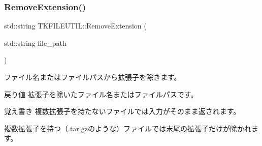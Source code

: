 \subsubsection{\texorpdfstring{Remove\+Extension()}{RemoveExtension()}}
{\footnotesize\ttfamily std\+::string T\+K\+F\+I\+L\+E\+U\+T\+I\+L\+::\+Remove\+Extension (\begin{DoxyParamCaption}\item[{std\+::string}]{file\+\_\+path }\end{DoxyParamCaption})}

ファイル名またはファイルパスから拡張子を除きます。 \begin{DoxyReturn}{戻り値}
拡張子を除いたファイル名またはファイルパスです。 
\end{DoxyReturn}
\begin{DoxyNote}{覚え書き}
複数拡張子を持たないファイルでは入力がそのまま返されます。 

複数拡張子を持つ（.\+tar.\+gzのような）ファイルでは末尾の拡張子だけが除かれます。 
\end{DoxyNote}
